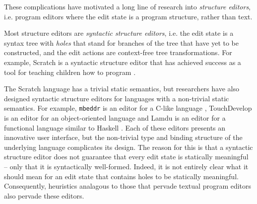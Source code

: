 

These complications have motivated a long line of research into \emph{structure editors}, i.e. program editors where the edit state is a  program structure, rather than text. %

Most structure editors are \emph{syntactic structure editors}, i.e. the edit state is a syntax tree with \emph{holes} that stand for branches of the tree that have yet to be constructed, and the edit actions are context-free tree transformations. For example, Scratch is a syntactic structure editor that has achieved success as a tool for teaching children how to program \cite{Resnick:2009:SP:1592761.1592779}. 

The Scratch language has a trivial static semantics, but researchers have also designed syntactic structure editors for  languages with a non-trivial static semantics. For example, \texttt{mbeddr} is an editor for a C-like language \cite{voelter_mbeddr:_2012}, TouchDevelop is an editor for an object-oriented language \cite{tillmann_touchdevelop:_2011} and Lamdu is an editor for a functional language similar to Haskell \cite{lamdu}. Each of these editors presents an innovative user interface, but the non-trivial type and binding structure of the underlying language complicates its design. The reason for this is that a syntactic structure editor does not guarantee that every edit state is statically meaningful -- only that it is syntactically well-formed. Indeed, it is not entirely clear what it should mean for an edit state that contains holes to be statically meaningful. Consequently, heuristics analagous to those that pervade textual program editors also pervade these editors.

